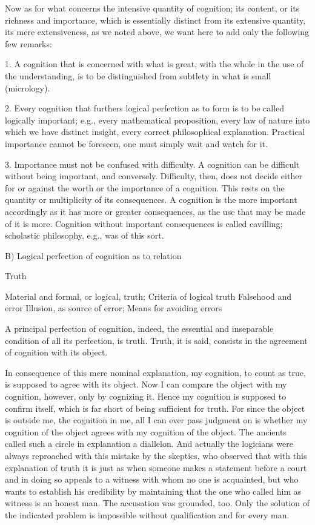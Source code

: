     Now as for what concerns the intensive quantity of cognition;
    its content, or its richness and importance,
    which is essentially distinct from its extensive quantity,
    its mere extensiveness, as we noted above,
    we want here to add only the following few remarks:

    1. A cognition that is concerned with what is great,
    with the whole in the use of the understanding,
    is to be distinguished from subtlety in what is small (micrology).

    2. Every cognition that furthers logical perfection
    as to form is to be called logically important;
    e.g., every mathematical proposition,
    every law of nature into which we have distinct insight,
    every correct philosophical explanation.
    Practical importance cannot be foreseen,
    one must simply wait and watch for it.

    3. Importance must not be confused with difficulty.
    A cognition can be difficult without being important, and conversely.
    Difficulty, then, does not decide either for or against
    the worth or the importance of a cognition.
    This rests on the quantity or multiplicity of its consequences.
    A cognition is the more important accordingly as
    it has more or greater consequences,
    as the use that may be made of it is more.
    Cognition without important consequences is called cavilling;
    scholastic philosophy, e.g., was of this sort.

    B) Logical perfection of cognition as to relation

    Truth

        Material and formal, or logical, truth;
        Criteria of logical truth
        Falsehood and error
        Illusion, as source of error;
        Means for avoiding errors

    A principal perfection of cognition, indeed,
    the essential and inseparable condition
    of all its perfection, is truth.
    Truth, it is said, consists in
    the agreement of cognition with its object.

    In consequence of this mere nominal explanation, my cognition,
    to count as true, is supposed to agree with its object.
    Now I can compare the object with my cognition, however,
    only by cognizing it.
    Hence my cognition is supposed to confirm itself,
    which is far short of being sufficient for truth.
    For since the object is outside me, the cognition in me,
    all I can ever pass judgment on is
    whether my cognition of the object
    agrees with my cognition of the object.
    The ancients called such a circle in explanation a diallelon.
    And actually the logicians were always reproached
    with this mistake by the skeptics,
    who observed that with this explanation of truth
    it is just as when someone makes a statement before a court
    and in doing so appeals to a witness with whom no one is acquainted,
    but who wants to establish his credibility by maintaining
    that the one who called him as witness is an honest man.
    The accusation was grounded, too.
    Only the solution of the indicated problem is
    impossible without qualification and for every man.

